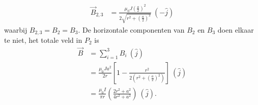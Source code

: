 \begin{enumerate}[leftmargin = 0cm,label = \subscript{P}{{\arabic*}}: ]
\begin{minipage}[t]{.48\textwidth}
\begin{description}[labelwidth=1.5cm, leftmargin=!]
\begin{align*}
                \vec{B}_{2,3} 
                    &=  \frac{\mu_0J(\frac{a}{2})^2}{2 \sqrt{r^2 + \left(\frac{a}{2}\right)^2}} \ (-\hat{j})
            \end{align*}
            waarbij $B_{2,3} = B_2 = B_3$. De horizontale componenten van $B_2$ en $B_3$ doen elkaar te niet, het totale veld in $P_2$ is
            \begin{align*}
                \vec{B} 
                    &= \sum_{i=1}^3 B_i \ (\hat{j}) \\
                    &= \frac{\mu_0Ja^2}{2r}\left[1 - \frac{r^2}{2\left(r^2 + \left(\frac{a}{2}\right)^2\right)}\right] \ (\hat{j}) \\
                    &=\frac{\mu_0I}{\pi r}\left(\frac{2r^2+a^2}{4r^2+a^2}\right) \ (\hat{j}).
            \end{align*}
        \end{description}
   \end{minipage}%
\end{enumerate}

\vspace{1cm}
